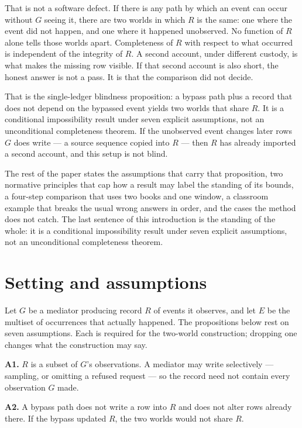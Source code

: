 \documentclass[11pt]{article}
\begin{document}
That is not a software defect. If there is any path by which an event can occur without $G$ seeing it, there are two worlds in which $R$ is the same: one where the event did not happen, and one where it happened unobserved. No function of $R$ alone tells those worlds apart. Completeness of $R$ with respect to what occurred is independent of the integrity of $R$. A second account, under different custody, is what makes the missing row visible. If that second account is also short, the honest answer is not a pass. It is that the comparison did not decide.

That is the single-ledger blindness proposition: a bypass path plus a record that does not depend on the bypassed event yields two worlds that share $R$. It is a conditional impossibility result under seven explicit assumptions, not an unconditional completeness theorem. If the unobserved event changes later rows $G$ does write --- a source sequence copied into $R$ --- then $R$ has already imported a second account, and this setup is not blind.

The rest of the paper states the assumptions that carry that proposition, two normative principles that cap how a result may label the standing of its bounds, a four-step comparison that uses two books and one window, a classroom example that breaks the usual wrong answers in order, and the cases the method does not catch. The last sentence of this introduction is the standing of the whole: it is a conditional impossibility result under seven explicit assumptions, not an unconditional completeness theorem.

\section{Setting and assumptions}

Let $G$ be a mediator producing record $R$ of events it observes, and let $E$ be the multiset of occurrences that actually happened. The propositions below rest on seven assumptions. Each is required for the two-world construction; dropping one changes what the construction may say.

\textbf{A1.} $R$ is a subset of $G$'s observations. A mediator may write selectively --- sampling, or omitting a refused request --- so the record need not contain every observation $G$ made.

\textbf{A2.} A bypass path does not write a row into $R$ and does not alter rows already there. If the bypass updated $R$, the two worlds would not share $R$.
\end{document}
